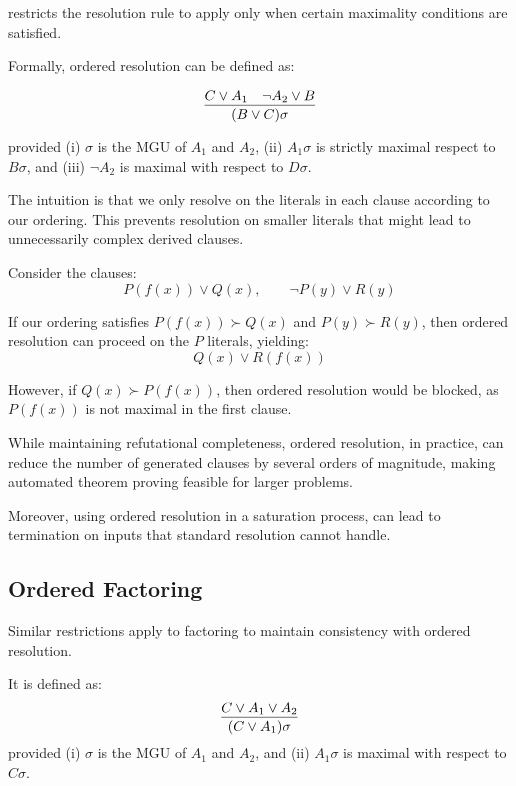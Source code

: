  restricts the resolution rule to apply only when certain maximality conditions are satisfied.

Formally, ordered resolution can be defined as:

\begin{equation}
  \infer{(B\lor C)\sigma}{C\lor A_1 & \neg A_2 \lor B}
\end{equation}
  
\indent provided (i) \(\sigma\) is the MGU of \(A_1\) and \(A_2\), (ii) \(A_1\sigma\) is strictly maximal respect to \(B\sigma\), and \indent (iii) \(\neg A_2\) is maximal with respect to \(D\sigma\).



\noindent The intuition is that we only resolve on the  literals in each clause according to our ordering. This prevents resolution on smaller literals that might lead to unnecessarily complex derived clauses.

Consider the clauses:
\[P(f(x)) \lor Q(x), \qquad \neg P(y) \lor R(y)\]

If our ordering satisfies \(P(f(x)) \succ Q(x)\) and \(P(y) \succ R(y)\), then ordered resolution can proceed on the \(P\) literals, yielding:
\[Q(x) \lor R(f(x))\]

However, if \(Q(x) \succ P(f(x))\), then ordered resolution would be blocked, as \(P(f(x))\) is not maximal in the first clause.

While maintaining refutational completeness, ordered resolution, in practice, can reduce the number of generated clauses by several orders of magnitude, making automated theorem proving feasible for larger problems.

Moreover, using ordered resolution in a saturation process, can lead to termination on inputs that standard resolution cannot handle.

\subsection{Ordered Factoring}\label{subsec:ordered-factoring}

Similar restrictions apply to factoring to maintain consistency with ordered resolution.

It is defined as:
\begin{equation}
  \infer{(C \lor A_1)\sigma}{C \lor A_1 \lor A_2}
\end{equation}
\indent provided (i) \(\sigma\) is the MGU of \(A_1\) and \(A_2\), and (ii) \(A_1\sigma\) is maximal with respect to \(C\sigma\).

